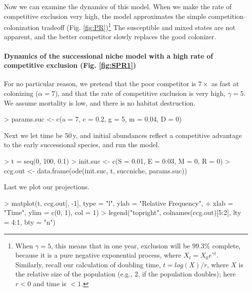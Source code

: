 Now we can examine the dynamics of this model. When we make the rate of competitive exclusion very high, the model approximates the simple competition--colonization tradeoff  (Fig. \ref{fig:PR})\footnote{When $\gamma=5$, this means that in one year, exclusion will be 99.3\% complete, because it is a pure negative exponential process, where $X_t=X_0e^{\gamma t}$. Similarly, recall our calculation of doubling time, $t=log(X)/r$, where $X$ is the relative size of the population (e.g., 2, if the population doubles); here $r<0$ and time is $< 1$.} The susceptible and mixed states are not apparent, and the better competitor slowly replaces the good colonizer.

\medskip \noindent
\begin{boxedminipage}{\linewidth}
  {\footnotesize
\paragraph{Dynamics of the successional niche model with a high rate of competitive exclusion (Fig. \ref{fig:SPR1})} 
For no particular reason, we pretend that the poor competitor is $7 \times$ as fast at colonizing ($\alpha=7$), and that the rate of competitive exclusion is very high, $\gamma=5$. We assume mortality is low, and there is no habitat destruction.
\begin{Schunk}
\begin{Sinput}
> params.suc <- c(a = 7, c = 0.2, g = 5, m = 0.04, D = 0)
\end{Sinput}
\end{Schunk}
Next we let time be 50\,y, and initial abundances reflect a competitive advantage to the early successional species, and run the model.
\begin{Schunk}
\begin{Sinput}
> t = seq(0, 100, 0.1)
> init.suc <- c(S = 0.01, E = 0.03, M = 0, R = 0)
> ccg.out <- data.frame(ode(init.suc, t, succniche, params.suc))
\end{Sinput}
\end{Schunk}
Last we plot our projections.
\begin{Schunk}
\begin{Sinput}
> matplot(t, ccg.out[, -1], type = "l", ylab = "Relative Frequency", 
+     xlab = "Time", ylim = c(0, 1), col = 1)
> legend("topright", colnames(ccg.out)[5:2], lty = 4:1, bty = "n")
\end{Sinput}
\end{Schunk}
}
\end{boxedminipage} \medskip

